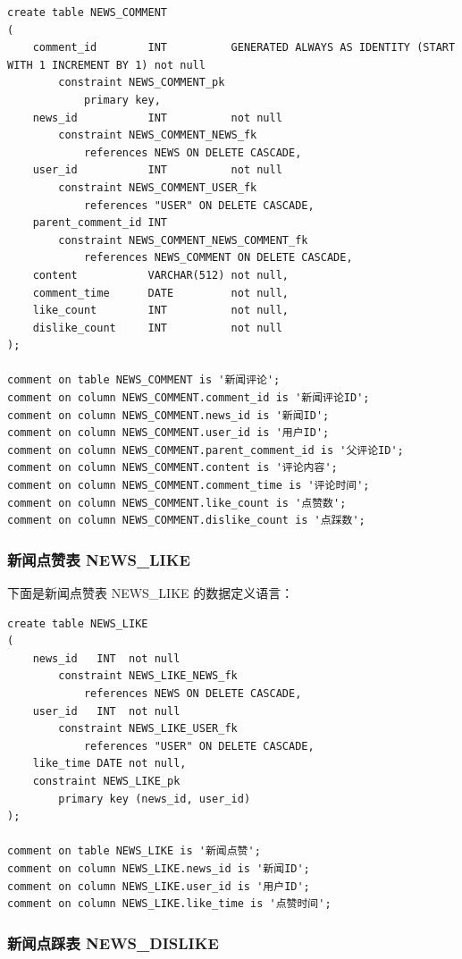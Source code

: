 \begin{verbatim}
create table NEWS_COMMENT
(
    comment_id        INT          GENERATED ALWAYS AS IDENTITY (START WITH 1 INCREMENT BY 1) not null
        constraint NEWS_COMMENT_pk
            primary key,
    news_id           INT          not null
        constraint NEWS_COMMENT_NEWS_fk
            references NEWS ON DELETE CASCADE,
    user_id           INT          not null
        constraint NEWS_COMMENT_USER_fk
            references "USER" ON DELETE CASCADE,
    parent_comment_id INT
        constraint NEWS_COMMENT_NEWS_COMMENT_fk
            references NEWS_COMMENT ON DELETE CASCADE,
    content           VARCHAR(512) not null,
    comment_time      DATE         not null,
    like_count        INT          not null,
    dislike_count     INT          not null
);

comment on table NEWS_COMMENT is '新闻评论';
comment on column NEWS_COMMENT.comment_id is '新闻评论ID';
comment on column NEWS_COMMENT.news_id is '新闻ID';
comment on column NEWS_COMMENT.user_id is '用户ID';
comment on column NEWS_COMMENT.parent_comment_id is '父评论ID';
comment on column NEWS_COMMENT.content is '评论内容';
comment on column NEWS_COMMENT.comment_time is '评论时间';
comment on column NEWS_COMMENT.like_count is '点赞数';
comment on column NEWS_COMMENT.dislike_count is '点踩数';
\end{verbatim}

\subsubsection{新闻点赞表 NEWS\_LIKE}

下面是新闻点赞表 NEWS\_LIKE 的数据定义语言：

\begin{verbatim}
create table NEWS_LIKE
(
    news_id   INT  not null
        constraint NEWS_LIKE_NEWS_fk
            references NEWS ON DELETE CASCADE,
    user_id   INT  not null
        constraint NEWS_LIKE_USER_fk
            references "USER" ON DELETE CASCADE,
    like_time DATE not null,
    constraint NEWS_LIKE_pk
        primary key (news_id, user_id)
);

comment on table NEWS_LIKE is '新闻点赞';
comment on column NEWS_LIKE.news_id is '新闻ID';
comment on column NEWS_LIKE.user_id is '用户ID';
comment on column NEWS_LIKE.like_time is '点赞时间';
\end{verbatim}

\subsubsection{新闻点踩表 NEWS\_DISLIKE}

